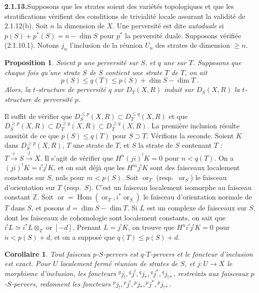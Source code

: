 \documentclass[12pt,a4paper]{article}
\theoremstyle{plain}
\newtheorem{proposition}[theorem]{Proposition}
\newtheorem{corollary}[theorem]{Corollaire}
\theoremstyle{definition}
\DeclareMathOperator{\Hom}{Hom}
\begin{document}
\smallskip
\noindent\textbf{2.1.13.}\quad Supposons que les strates soient des vari\'et\'es topologiques et que les stratifications v\'erifient des conditions de trivialit\'e locale assurant la validit\'e de 2.1.12(b). Soit $n$ la dimension de $X$. Une perversit\'e est dite \emph{autoduale} si $p(S) + p^*(S) = n - \dim S$ pour $p^*$ la perversit\'e duale. Supposons v\'erifi\'ee (2.1.10.1). Notons $j_n$ l'inclusion de la r\'eunion $U_n$ des strates de dimension $\geqslant n$.

\begin{proposition}\label{prop:2.1.14}
Soient $p$ une perversit\'e sur $S$, et $q$ une sur $T$. Supposons que chaque fois qu'une strate $S$ de $S$ contient une strate $T$ de $T$, on ait
\[
p(S) \leqslant q(T) \leqslant p(S) + \dim S - \dim T\;.
\]
Alors, la $t$-structure de perversit\'e $q$ sur $D_T(X, R)$ induit sur $D_S(X, R)$ la $t$-structure de perversit\'e $p$.
\end{proposition}

Il suffit de v\'erifier que $D_S^{\leqslant p}(X, R) \subset D_T^{\leqslant q}(X, R)$ et que $D_S^{\geqslant p}(X, R) \subset D_T^{\geqslant q}(X, R) \subset D_T^{\geqslant q}(X, R)$. La premi\`ere inclusion r\'esulte aussit\^ot de ce que $p(S) \leqslant q(T)$ pour $S \supset T$. V\'erifions la seconde. Soient $K$ dans $D_S^{\geqslant p}(X, R)$, $T$ une strate de $T$, et $S$ la strate de $S$ contenant $T$ : $T \xrightarrow{i} S \xrightarrow{j} X$. Il s'agit de v\'erifier que $H^n(ji)^! K = 0$ pour $n < q(T)$. On a $(ji)^! K = i^! j^! K$, et on sait d\'ej\`a que les $H^m j^! K$ sont des faisceaux localement constants sur $S$, nuls pour $m < p(S)$. Soit $\operatorname{or}_T$ (resp.\ $\operatorname{or}_S$) le faisceau d'orientation sur $T$ (resp.\ $S$). C'est un faisceau localement isomorphe au faisceau constant $\mathbb{Z}$. Soit $\operatorname{or} = \Hom(\operatorname{or}_T, i^* \operatorname{or}_S)$ le faisceau d'orientation normale de $T$ dans $S$, et posons $d = \dim S - \dim T$. Si $L$ est un complexe de faisceaux sur $S$, dont les faisceaux de cohomologie sont localement constants, on sait que $i^! L \simeq i^* L \otimes_{\mathbb{Z}} \operatorname{or}[-d]$. Prenant $L = j^! K$, on trouve que $H^n i^! j^! K = 0$ pour $n < p(S) + d$, et on a suppos\'e que $q(T) \leqslant p(S) + d$.

\begin{corollary}\label{cor:2.1.15}
Tout faisceau $p$-$S$-pervers est $q$-$T$-pervers et le foncteur d'inclusion est exact. Pour $U$ localement ferm\'e r\'eunion de strates de $S$, et $j : U \to X$ le morphisme d'inclusion, les foncteurs ${}^q j_!, {}^q j^!, {}^q j_*, {}^q j^*, {}^q j_{!*}$, restreints aux faisceaux $p$-$S$-pervers, redonnent les foncteurs ${}^p j_!, {}^p j^!, {}^p j_*, {}^p j^*, {}^p j_{!*}$.
\end{corollary}
\end{document}
